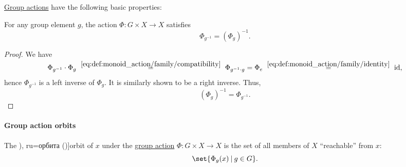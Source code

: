 \begin{proposition}\label{thm:def:group_action}
  \hyperref[def:group_action]{Group actions} have the following basic properties:
  \begin{thmenum}
     For any group element \( g \), the action \( \Phi: G \times X \to X \) satisfies
    \begin{equation}\label{eq:thm:def:group_action/negation}
      \Phi_{g^{-1}} = (\Phi_g)^{-1}.
    \end{equation}
  \end{thmenum}
\end{proposition}
\begin{proof}
   We have
  \begin{equation*}
    \Phi_{g^{-1}} \cdot \Phi_g
    \reloset {\eqref{eq:def:monoid_action/family/compatibility}} =
    \Phi_{g^{-1} \cdot g}
    =
    \Phi_e
    \reloset {\eqref{eq:def:monoid_action/family/identity}} =
    \id,
  \end{equation*}
  hence \( \Phi_{g^{-1}} \) is a left inverse of \( \Phi_g \). It is similarly shown to be a right inverse. Thus,
  \begin{equation*}
    (\Phi_g)^{-1} = \Phi_{g^{-1}}.
  \end{equation*}
\end{proof}

\paragraph{Group action orbits}

\begin{definition}\label{def:group_action_orbit}
  The \term[bg=орбита (\cite[def. IV.20]{ГеновМиховскиМоллов1991Алгебра}), ru=орбита (\cite[453]{Винберг2014КурсАлгебры})]{orbit} of \( x \) under the \hyperref[def:group_action]{group action} \( \Phi: G \times X \to X \) is the set of all members of \( X \) \enquote{reachable} from \( x \):
  \begin{equation*}
    \set{ \Phi_g(x) \given g \in G }.
  \end{equation*}
\end{definition}


